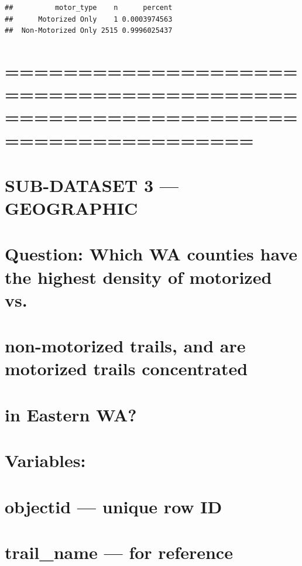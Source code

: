 \documentclass[
]{article}
\begin{document}
\begin{verbatim}
##          motor_type    n      percent
##      Motorized Only    1 0.0003974563
##  Non-Motorized Only 2515 0.9996025437
\end{verbatim}

\section{=============================================================================}\label{section-15}

\section{SUB-DATASET 3 --- GEOGRAPHIC}\label{sub-dataset-3-geographic}

\section{Question: Which WA counties have the highest density of
motorized
vs.}\label{question-which-wa-counties-have-the-highest-density-of-motorized-vs.}

\section{non-motorized trails, and are motorized trails
concentrated}\label{non-motorized-trails-and-are-motorized-trails-concentrated}

\section{in Eastern WA?}\label{in-eastern-wa}

\section{}\label{section-16}

\section{Variables:}\label{variables-2}

\section{objectid --- unique row ID}\label{objectid-unique-row-id-2}

\section{trail\_name --- for
reference}\label{trail_name-for-reference-1}
\end{document}
